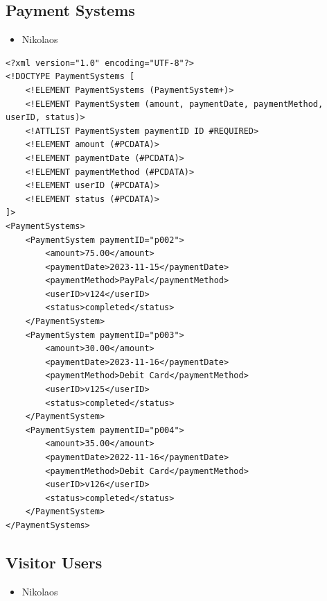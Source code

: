 \documentclass{article} %
\begin{document}
\subsection{Payment Systems}
\begin{itemize}
    \item Nikolaos
\end{itemize}

\begin{verbatim}
<?xml version="1.0" encoding="UTF-8"?>
<!DOCTYPE PaymentSystems [
    <!ELEMENT PaymentSystems (PaymentSystem+)>
    <!ELEMENT PaymentSystem (amount, paymentDate, paymentMethod, userID, status)>
    <!ATTLIST PaymentSystem paymentID ID #REQUIRED>
    <!ELEMENT amount (#PCDATA)>
    <!ELEMENT paymentDate (#PCDATA)>
    <!ELEMENT paymentMethod (#PCDATA)>
    <!ELEMENT userID (#PCDATA)>
    <!ELEMENT status (#PCDATA)>
]>
<PaymentSystems>
    <PaymentSystem paymentID="p002">
        <amount>75.00</amount>
        <paymentDate>2023-11-15</paymentDate>
        <paymentMethod>PayPal</paymentMethod>
        <userID>v124</userID>
        <status>completed</status>
    </PaymentSystem>
    <PaymentSystem paymentID="p003">
        <amount>30.00</amount>
        <paymentDate>2023-11-16</paymentDate>
        <paymentMethod>Debit Card</paymentMethod>
        <userID>v125</userID>
        <status>completed</status>
    </PaymentSystem>
    <PaymentSystem paymentID="p004">
        <amount>35.00</amount>
        <paymentDate>2022-11-16</paymentDate>
        <paymentMethod>Debit Card</paymentMethod>
        <userID>v126</userID>
        <status>completed</status>
    </PaymentSystem>
</PaymentSystems>
\end{verbatim}

\subsection{Visitor Users}
\begin{itemize}
    \item Nikolaos
\end{itemize}
\end{document}
